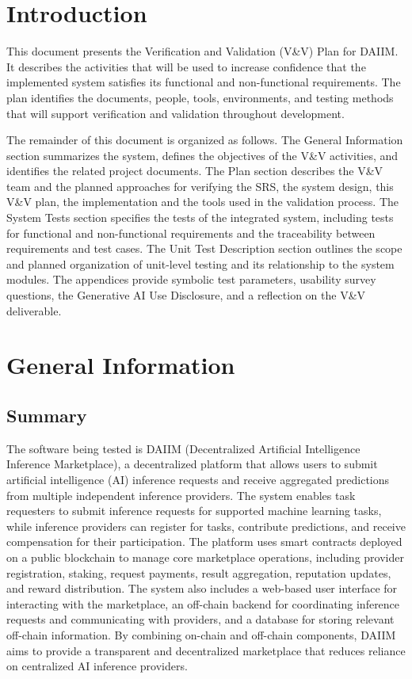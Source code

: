 \documentclass[12pt]{article}
\begin{document}
\newpage


\section{Introduction}

This document presents the Verification and Validation (V\&V) Plan for DAIIM.
It describes the activities that will be used to increase confidence that the
implemented system satisfies its functional and non-functional requirements. The plan
identifies the documents, people, tools, environments, and testing methods that
will support verification and validation throughout development.

The remainder of this document is organized as follows. The
General Information section summarizes the system, defines the
objectives of the V\&V activities, and identifies the related project
documents. The Plan section describes the V\&V team and the planned
approaches for verifying the SRS, the system design, this V\&V plan, the implementation
and the tools used in the validation process. 
The System Tests section specifies the tests of the
integrated system, including tests for functional and non-functional
requirements and the traceability between requirements and test cases. The
Unit Test Description section outlines the scope and planned
organization of unit-level testing and its relationship to the system
modules. The appendices provide symbolic test parameters, usability
survey questions, the Generative AI Use Disclosure, and a reflection on the
V\&V deliverable.

\section{General Information}

\subsection{Summary}

The software being tested is DAIIM (Decentralized Artificial Intelligence Inference Marketplace), a decentralized platform that allows users to submit artificial intelligence (AI) inference requests and receive aggregated predictions from multiple independent inference providers.
The system enables task requesters to submit inference requests for supported machine learning tasks, while inference providers can register for tasks, contribute predictions, and receive compensation for their participation. The platform uses smart contracts deployed on a public blockchain to manage core marketplace operations, including provider registration, staking, request payments, result aggregation, reputation updates, and reward distribution.
The system also includes a web-based user interface for interacting with the marketplace, an off-chain backend for coordinating inference requests and communicating with providers, and a database for storing relevant off-chain information. By combining on-chain and off-chain components, DAIIM aims to provide a transparent and decentralized marketplace that reduces reliance on centralized AI inference providers.
\end{document}
